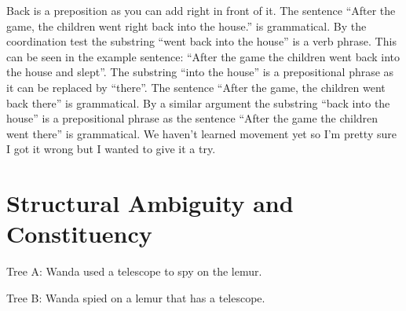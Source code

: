 \documentclass[20pt]{article}
\begin{document}
Back is a preposition as you can add right in front of it. The sentence ``After
the game, the children went right back into the house.'' is grammatical.
By the coordination test the substring ``went back into the house'' is a verb
phrase. This can be seen in the example sentence: ``After the game the children
went back into the house and slept''.
The substring ``into the house'' is a prepositional phrase as it can be replaced
by ``there''. The sentence ``After the game, the children went back
there'' is grammatical.
By a similar argument the substring ``back into the house'' is a prepositional
phrase as the sentence ``After the game the children went there'' is grammatical.
We haven't learned movement yet so I'm pretty sure I got it wrong but I wanted
to give it a try.

\section{Structural Ambiguity and Constituency}
Tree A: Wanda used a telescope to spy on the lemur. \\


Tree B: Wanda spied on a lemur that has a telescope. \\

\end{document}

